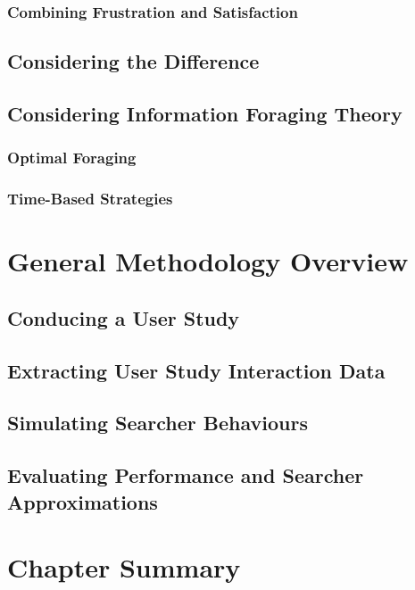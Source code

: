 \subsubsection{Combining Frustration and Satisfaction}

\subsection{Considering the Difference}

\subsection{Considering Information Foraging Theory}

\subsubsection{Optimal Foraging}

\subsubsection{Time-Based Strategies}

\section{General Methodology Overview}\label{sec:csm:methodology}

\subsection{Conducing a User Study}

\subsection{Extracting User Study Interaction Data}

\subsection{Simulating Searcher Behaviours}

\subsection{Evaluating Performance and Searcher Approximations}

\section{Chapter Summary}